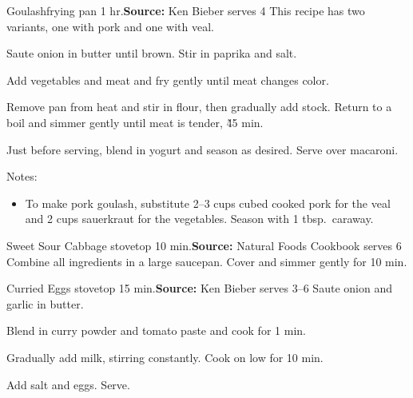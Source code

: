 \begin{recipe}{Goulash}{frying pan \hfill 1 hr.}{\textbf{Source:} Ken Bieber \hfill serves 4}
 \freeform [CB] This recipe has two variants, one with pork and one with veal.

 Saute onion in butter until brown. Stir in paprika and salt.

 Add vegetables and meat and fry gently until meat changes color.

 Remove pan from heat and stir in flour, then gradually add stock. Return to a boil and simmer gently until meat is tender, \~45 min.

 Just before serving, blend in yogurt and season as desired. Serve over macaroni.

 \freeform Notes:
 \begin{itemize}
  \item To make pork goulash, substitute 2--3 cups cubed cooked pork for the veal and 2 cups sauerkraut for the vegetables. Season with 1 tbsp.\ caraway.
 \end{itemize}
\end{recipe}

\begin{recipe}{Sweet \And Sour Cabbage}{ \hfill stovetop \hfill 10 min.}{\textbf{Source:} Natural Foods Cookbook \hfill serves 6}
 Combine all ingredients in a large saucepan. Cover and simmer gently for 10 min.
\end{recipe}

\begin{recipe}{Curried Eggs}{ \hfill stovetop \hfill 15 min.}{\textbf{Source:} Ken Bieber \hfill serves 3--6}
 Saute onion and garlic in butter.

 Blend in curry powder and tomato paste and cook for 1 min.

 Gradually add milk, stirring constantly. Cook on low for 10 min.

 Add salt and eggs. Serve.
\end{recipe}

